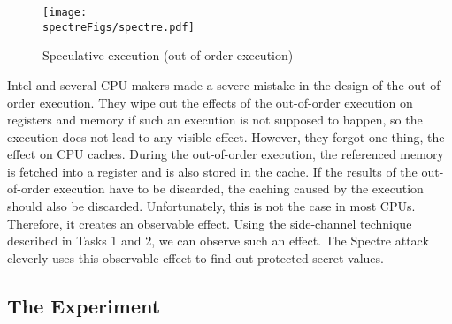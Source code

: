 \begin{figure}[htb]
\centering
\texttt{[image: \\spectreFigs/spectre.pdf]}
\caption{Speculative execution (out-of-order execution)}
\label{spectre:fig:spectre}
\end{figure}


Intel and several CPU makers made a severe mistake in the design of the out-of-order execution.
They wipe out the effects of the out-of-order execution on registers and memory
if such an execution is not supposed to happen, so the execution does not lead to
any visible effect. However, they forgot one thing, the effect on CPU caches.
During the out-of-order execution, the referenced memory is fetched into a register and is
also stored in the cache. If the results of the out-of-order execution have to be discarded,
the caching caused by the execution should also be discarded. Unfortunately, this is
not the case in most CPUs. Therefore, it creates an observable effect.
Using the side-channel technique described in Tasks 1 and 2, we
can observe such an effect. The Spectre attack cleverly uses this
observable effect to find out protected secret values.





\subsection{The Experiment}

